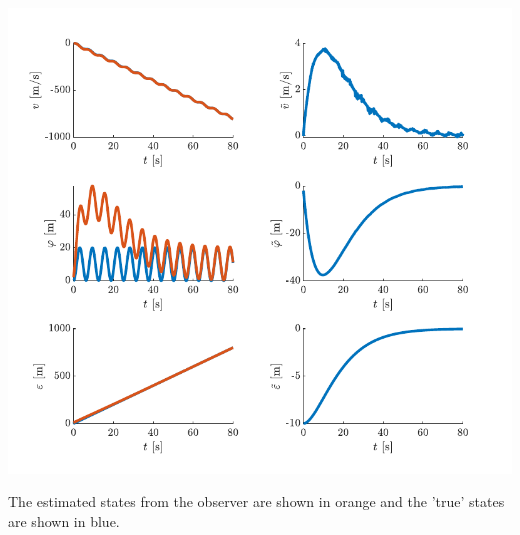 \includegraphics{figures/le4_3_7a.pdf}

The estimated states from the observer are shown in orange and the 'true' states are shown in blue.

